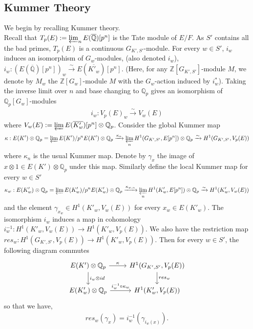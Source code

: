 \documentclass[reqno,10pt]{amsart}
\newcommand{\qp}{\mathbb{Q}_{p}}
\newcommand{\q}{\mathbb{Q}}
\newcommand{\z}{\mathbb{Z}}
\theoremstyle{plain}
\theoremstyle{definition}
\begin{document}
\subsection{Kummer Theory} \label{kummer}
We begin by recalling Kummer theory.
\\
Recall that $T_p(E) := \varprojlim_n E(\overline{\q})[p^n]$ is the Tate module of $E/F$. As $S'$ contains all the bad primes, $T_p(E)$ is a continuous $G_{K',S'}$-module. For every $w \in S'$, $i_w$ induces an isomorphism of $G_w$-modules, (also denoted $i_w$), $i_w : (E(\overline{\q})[p^n])_w \xrightarrow{\sim} E(\overline{K'_w})[p^n]$. (Here, for any $\z[G_{K',S'}]$-module $M$, we denote by $M_w$ the $\z[G_w]$-module $M$ with the $G_w$-action induced by $i_w^*$). Taking the inverse limit over $n$ and base changing to $\qp$ gives an isomorphism of $\qp[G_w]$-modules
\begin{align*}
    i_w : V_p(E)_w \xrightarrow{\sim} V_w(E) 
\end{align*}
where $V_w(E) := \varprojlim E(\overline{K'_w})[p^n] \otimes \qp$. Consider the global Kummer map
\begin{align*}
   \kappa : E(K') \otimes \qp = \varprojlim E(K')/p^nE(K') \otimes \qp \xrightarrow{\kappa_n} \varprojlim_n H^1(G_{K',S'},E[p^n]) \otimes \qp \xrightarrow{\sim} H^1(G_{K',S'},V_p(E))
\end{align*}
where $\kappa_n$ is the usual Kummer map. Denote by $\gamma_x$ the image of $x \otimes 1 \in E(K') \otimes \qp$ under this map. Similarly define the local Kummer map for every $w \in S'$
\begin{align*}
    \kappa_w : E(K'_w) \otimes \qp = \varprojlim E(K'_w)/p^nE(K'_w) \otimes \qp \xrightarrow{\kappa_{w,n}} \varprojlim_n H^1(K'_w,E[p^n]) \otimes \qp \xrightarrow{\sim} H^1(K'_w,V_w(E))
\end{align*}
and the element $\gamma_{x_w} \in H^1(K'_w,V_w(E))$ for every $x_w \in E(K'_w)$. The isomorphism $i_w$ induces a map in cohomology $i_w^{-1} : H^1(K'_w,V_w(E)) \rightarrow H^1(K'_w,V_p(E))$. We also have the restriction map $res_w : H^1(G_{K',S'},V_p(E)) \rightarrow H^1(K'_w,V_p(E))$. Then for every $w \in S'$, the following diagram commutes
$$ 
\begin{tikzcd} 
	E(K') \otimes \qp \arrow[r,"\kappa"] \arrow[d,"i_w \otimes id"] &
	H^1(G_{K',S'},V_p(E)) \arrow[d,"res_w"] 
	\\
	E(K'_w) \otimes \qp \arrow[r,"i_w^{-1} \circ \kappa_w"] &
	H^1(K'_w,V_p(E))
\end{tikzcd}
$$
so that we have, 
\begin{align} \label{comm diag kummer theory}
    res_w(\gamma_x) = i_w^{-1}(\gamma_{i_w(x)}). 
\end{align}
\end{document}
